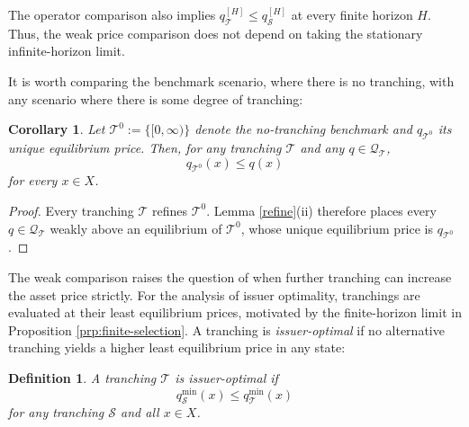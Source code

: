 \documentclass[11pt]{article}
\theoremstyle{plain}
\newtheorem{dfn}{Definition}%
\newtheorem{crl}{Corollary}%
\begin{document}
The operator comparison also implies $q_{\mathcal{T}}^{[H]}\leq q_{\mathcal{S}}^{[H]}$ at every finite horizon $H$. Thus, the weak price comparison does not depend on taking the stationary infinite-horizon limit.

It is worth comparing the benchmark scenario, where there is no tranching, with any scenario where there is some degree of tranching:

\begin{crl} \label{cor:eonben}
Let $\mathcal{T}^0:=\{[0,\infty)\}$ denote the no-tranching benchmark and $q_{\mathcal{T}^0}$ its unique equilibrium price. Then, for any tranching $\mathcal{T}$ and any $q\in\mathcal{Q}_{\mathcal{T}}$,
\begin{equation} \label{eq:eonben}
q_{\mathcal{T}^0}(x)\leq q(x)
\end{equation}
for every $x\in X$.
\end{crl}

\begin{proof}
Every tranching $\mathcal{T}$ refines $\mathcal{T}^0$. Lemma \ref{refine}(ii) therefore places every $q\in\mathcal{Q}_{\mathcal{T}}$ weakly above an equilibrium of $\mathcal{T}^0$, whose unique equilibrium price is $q_{\mathcal{T}^0}$.
\end{proof}

The weak comparison raises the question of when further tranching can increase the asset price strictly. For the analysis of issuer optimality, tranchings are evaluated at their least equilibrium prices, motivated by the finite-horizon limit in Proposition \ref{prp:finite-selection}. A tranching is \textit{issuer-optimal} if no alternative tranching yields a higher least equilibrium price in any state:
\begin{dfn} \label{def:fse}
A tranching $\mathcal{T}$ is issuer-optimal if
\begin{equation*}
q_{\mathcal{S}}^{\min}(x) \leq
q_{\mathcal{T}}^{\min}(x)
\end{equation*}
for any tranching $\mathcal{S}$ and all $x\in X$.
\end{dfn}
\end{document}

